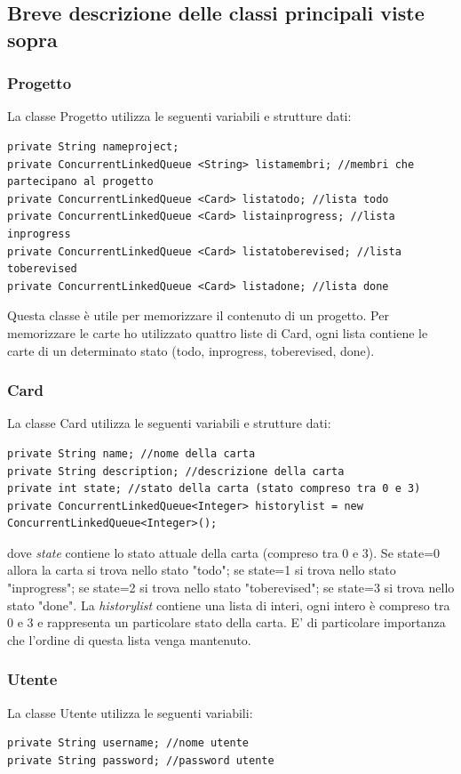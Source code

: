 \documentclass{article} %
\begin{document}
\subsection{Breve descrizione delle classi principali viste sopra}
\subsubsection{Progetto}
La classe Progetto utilizza le seguenti variabili e strutture dati:
\begin{lstlisting}
private String nameproject;
private ConcurrentLinkedQueue <String> listamembri; //membri che partecipano al progetto
private ConcurrentLinkedQueue <Card> listatodo; //lista todo
private ConcurrentLinkedQueue <Card> listainprogress; //lista inprogress
private ConcurrentLinkedQueue <Card> listatoberevised; //lista toberevised
private ConcurrentLinkedQueue <Card> listadone; //lista done
\end{lstlisting}
Questa classe è utile per memorizzare il contenuto di un progetto. Per memorizzare le carte ho utilizzato quattro liste di Card, ogni lista contiene le carte di un determinato stato (todo, inprogress, toberevised, done).
\subsubsection{Card}
La classe Card utilizza le seguenti variabili e strutture dati:
\begin{lstlisting}
private String name; //nome della carta
private String description; //descrizione della carta
private int state; //stato della carta (stato compreso tra 0 e 3)
private ConcurrentLinkedQueue<Integer> historylist = new ConcurrentLinkedQueue<Integer>();
\end{lstlisting}
dove {\itshape state} contiene lo stato attuale della carta (compreso tra 0 e 3). Se state=0 allora la carta si trova nello stato "todo"; se state=1 si trova nello stato "inprogress"; se state=2 si trova nello stato "toberevised"; se state=3 si trova nello stato "done". La {\itshape historylist} contiene una lista di interi, ogni intero è compreso tra 0 e 3 e rappresenta un particolare stato della carta. E' di particolare importanza che l'ordine di questa lista venga mantenuto.
\subsubsection{Utente}
La classe Utente utilizza le seguenti variabili:
\begin{lstlisting}
private String username; //nome utente
private String password; //password utente
\end{lstlisting}
\end{document}
